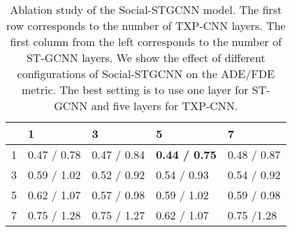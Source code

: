 \documentclass[10pt,twocolumn,letterpaper]{article}
\newcommand*{\ours}{Social-STGCNN }
\begin{document}
\begin{table}[ht]

\begin{tabular}{l||l|l|l|l}
  & 1           & 3           & 5           & 7           \\ \hline
 \midrule
1 & 0.47 / 0.78 & 0.47 / 0.84 & \textbf{0.44 / 0.75} & 0.48 / 0.87 \\ \hline
3 & 0.59 / 1.02 & 0.52 / 0.92 & 0.54 / 0.93 & 0.54 / 0.92 \\ \hline
5 & 0.62 / 1.07 & 0.57 / 0.98 & 0.59 / 1.02 & 0.59 / 0.98 \\ \hline
7 & 0.75 / 1.28 & 0.75 / 1.27 & 0.62 / 1.07 & 0.75 /1.28 \\
\midrule
\end{tabular}
\begin{center}
    

\caption{Ablation study of the \ours model. The first row corresponds to the number of TXP-CNN layers. The first column from the left corresponds to the number of ST-GCNN layers. We show the effect of different configurations of \ours on the ADE/FDE metric. The best setting is to use one layer for ST-GCNN and five layers for TXP-CNN.}
\end{center}
\label{tb:ablation}
\end{table}
\end{document}
